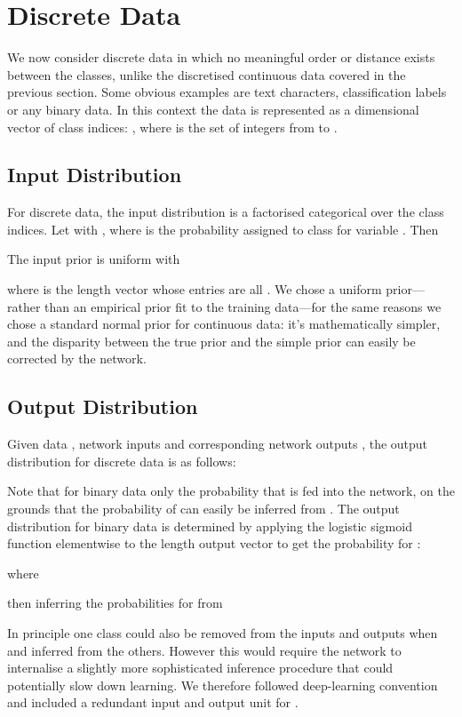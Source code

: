 \documentclass[11pt,table]{article}
\newcommand{\0}[1]{\constvec{0}{#1}}
\newcommand{\1}[1]{\constvec{1}{#1}}
\begin{document}
\section{Discrete Data}\label{sec:discrete}
We now consider discrete data in which no meaningful order or distance exists between the classes, unlike the discretised continuous data covered in the previous section.
Some obvious examples are text characters, classification labels or any binary data. 
In this context the data is represented as a  dimensional vector of class indices:  , where  is the set of integers from  to .
\subsection{Input Distribution \texorpdfstring{}{}}\label{sec:disc_input}
For discrete data, the input distribution is a factorised categorical over the class indices.
Let  with , where  is the probability assigned to class  for variable . 
Then

The input prior is uniform with

where  is the length  vector whose entries are all .
We chose a uniform prior---rather than an empirical prior fit to the training data---for the same reasons we chose a standard normal prior for continuous data: it's mathematically simpler, and the disparity between the true prior and the simple prior can easily be corrected by the network.
\subsection{Output Distribution \texorpdfstring{}{}}\label{sec:disc_output}
Given data , network inputs  and corresponding network outputs , the output distribution for discrete data is as follows:

Note that for binary data only the probability  that  is fed into the network, on the grounds that the probability of  can easily be inferred from .
The output distribution for binary data is determined by applying the logistic sigmoid function elementwise to the length  output vector to get the probability for :

where

then inferring the probabilities for  from

In principle one class could also be removed from the inputs and outputs when  and inferred from the others.
However this would require the network to internalise a slightly more sophisticated inference procedure that could potentially slow down learning.
We therefore followed deep-learning convention and included a redundant input and output unit for .
\end{document}

